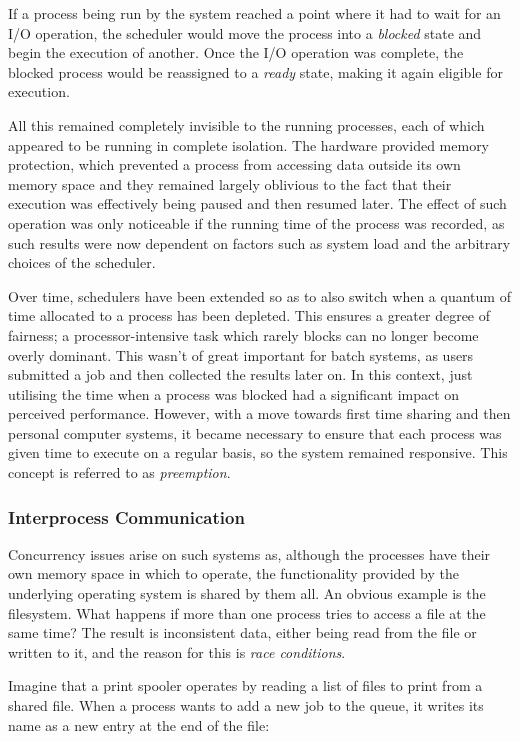 If a process being run by the system reached a point where it had to
wait for an I/O operation, the scheduler would move the process into a
\emph{blocked} state and begin the execution of another.  Once the I/O
operation was complete, the blocked process would be reassigned to a
\emph{ready} state, making it again eligible for execution.

All this remained completely invisible to the running processes, each
of which appeared to be running in complete isolation.  The hardware
provided memory protection, which prevented a process from accessing
data outside its own memory space and they remained largely oblivious
to the fact that their execution was effectively being paused and then
resumed later.  The effect of such operation was only noticeable if
the running time of the process was recorded, as such results were now
dependent on factors such as system load and the arbitrary choices of
the scheduler.

Over time, schedulers have been extended so as to also switch when a
quantum of time allocated to a process has been depleted.  This
ensures a greater degree of fairness; a processor-intensive task which
rarely blocks can no longer become overly dominant.  This wasn't of
great important for batch systems, as users submitted a job and then
collected the results later on.  In this context, just utilising the
time when a process was blocked had a significant impact on perceived
performance.  However, with a move towards first time sharing and then
personal computer systems, it became necessary to ensure that each
process was given time to execute on a regular basis, so the system
remained responsive.  This concept is referred to as \emph{preemption}.

\subsubsection{Interprocess Communication}

Concurrency issues arise on such systems as, although the processes
have their own memory space in which to operate, the functionality
provided by the underlying operating system is shared by them all.  An
obvious example is the filesystem.  What happens if more than one
process tries to access a file at the same time?  The result is
inconsistent data, either being read from the file or written to it,
and the reason for this is \emph{race conditions}.

Imagine that a print spooler operates by reading a list of files to
print from a shared file.  When a process wants to add a new job to
the queue, it writes its name as a new entry at the end of the file:

